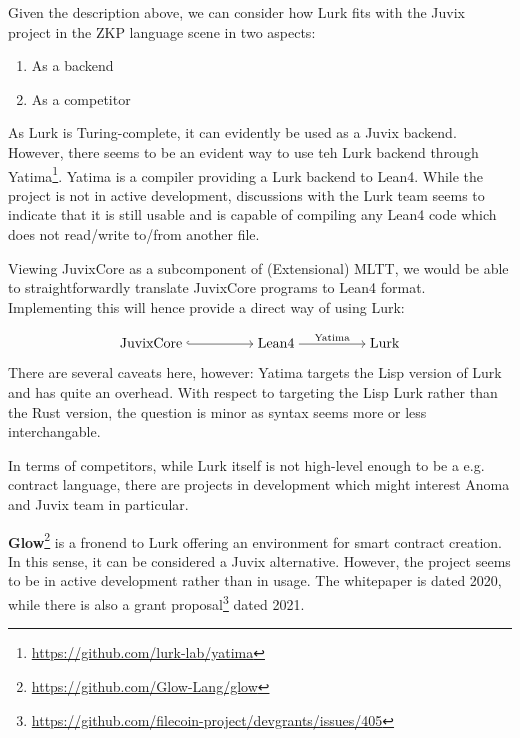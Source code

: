 \documentclass[
    9pt,            %
    techreport,        %
    affiltop,       %
]{art}
\begin{document}
Given the description above, we can consider how Lurk fits with the Juvix project in the ZKP language scene in two aspects: 

\begin{enumerate}
    \item As a backend
    \item As a competitor
\end{enumerate}

As Lurk is Turing-complete, it can evidently be used as a Juvix backend. However, there seems to be an evident way to use teh Lurk backend through Yatima\footnote{\url{https://github.com/lurk-lab/yatima}}. Yatima is a compiler providing a Lurk backend to Lean4. While the project is not in active development, discussions with the Lurk team seems to indicate that it is still usable and is capable of compiling any Lean4 code which does not read/write to/from another file. 

Viewing JuvixCore as a subcomponent of (Extensional) MLTT, we would be able to straightforwardly translate JuvixCore programs to Lean4 format. Implementing this will hence provide a direct way of using Lurk:

\[\begin{tikzcd}[cramped]
	{\text{JuvixCore}} && {\text{Lean4}} && {\text{Lurk}}
	\arrow[hook, from=1-1, to=1-3]
	\arrow["{\text{Yatima}}", from=1-3, to=1-5]
\end{tikzcd}\]

There are several caveats here, however: Yatima targets the Lisp version of Lurk and has quite an overhead. With respect to targeting the Lisp Lurk rather than the Rust version, the question is minor as syntax seems more or less interchangable. 

In terms of competitors, while Lurk itself is not high-level enough to be a e.g. contract language, there are projects in development which might interest Anoma and Juvix team in particular. 

\textbf{Glow}\footnote{\url{https://github.com/Glow-Lang/glow}} is a fronend to Lurk offering an environment for smart contract creation. In this sense, it can be considered a Juvix alternative. However, the project seems to be in active development rather than in usage. The whitepaper is dated 2020, while there is also a grant proposal\footnote{\url{https://github.com/filecoin-project/devgrants/issues/405}} dated 2021. 
\end{document}
